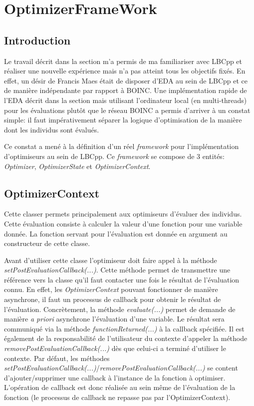 \documentclass[a4paper, 11pt]{article}
\begin{document}
\section{OptimizerFrameWork}
\subsection{Introduction}
Le travail décrit dans la section %
m'a permis de ma familiariser avec LBCpp et réaliser une nouvelle expérience mais n'a pas atteint tous les objectifs fixés. En effet, un désir de Francis Maes était de disposer d'EDA au sein de LBCpp et ce de manière indépendante par rapport à \textsc{BOINC}. Une implémentation rapide de l'EDA décrit dans la section %
mais utilisant l'ordinateur local (en multi-threads) pour les évaluations plutôt que le réseau \textsc{BOINC} a permis d'arriver à un constat simple: il faut impérativement séparer la logique d'optimisation de la manière dont les individus sont évalués.

Ce constat a mené à la définition d'un réel \textit{framework} pour l'implémentation d'optimiseurs au sein de LBCpp. Ce \textit{framework} se compose de 3 entités: \textit{Optimizer}, \textit{OptimizerState} et \textit{OptimizerContext}. %

\subsection{OptimizerContext}
Cette classer permets principalement aux optimiseurs d'évaluer des individus. Cette évaluation consiste à calculer la valeur d'une fonction pour une variable donnée. La fonction servant pour l'évaluation est donnée en argument au constructeur de cette classe.

Avant d'utiliser cette classe l'optimiseur doit faire appel à la méthode \textit{setPostEvaluationCallback(...)}. Cette méthode permet de transmettre une référence vers la classe qu'il faut contacter une fois le résultat de l'évaluation connu. En effet, les \textit{OptimizerContext} pouvant fonctionner de manière asynchrone, il faut un processus de callback pour obtenir le résultat de l'évaluation. Concrètement, la méthode \textit{evaluate(...)} permet de demande de manière \textit{a priori} asynchrone l'évaluation d'une variable. Le résultat sera communiqué via la méthode \textit{functionReturned(...)} à la callback spécifiée. Il est également de la responsabilité de l'utilisateur du contexte d'appeler la méthode \textit{removePostEvaluationCallback(...)} dès que celui-ci a terminé d'utiliser le contexte. Par défaut, les méthodes \textit{setPostEvaluationCallback(...)}/\textit{removePostEvaluationCallback(...)} se content d'ajouter/supprimer une callback à l'instance de la fonction à optimiser. L'opération de callback est donc réalisée au sein même de l'évaluation de la fonction (le processus de callback ne repasse pas par l'OptimizerContext).
\end{document}
